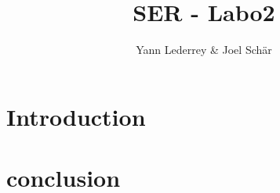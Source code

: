 \documentclass[a4paper]{article}
\title{SER - Labo2}
\author{Yann Lederrey \& Joel Schär}
\begin{document}
\maketitle
\pagebreak

\tableofcontents
\pagebreak

\section{Introduction}


\section{conclusion}
\end{document}

